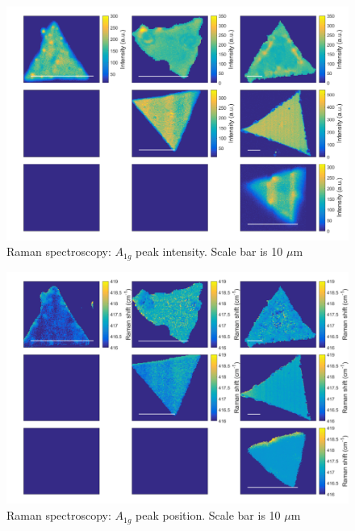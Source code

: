 \documentclass[12pt]{article}
\begin{document}
{\begin{figure}[h]
\begin{center}
\includegraphics[scale=0.3]{PaperSIMapsIntensityA.png}
\caption{Raman spectroscopy: $A_{1g}$ peak intensity. Scale bar is 10 $\mu$m}
\label{fig:PaperSIMapsIntensityA}
\end{center}
\end{figure}

\begin{figure}[h]
\begin{center}
\includegraphics[scale=0.3]{PaperSIMapsPositionA.png}
\caption{Raman spectroscopy: $A_{1g}$ peak position. Scale bar is 10 $\mu$m}
\label{fig:PaperSIMapsPositionA}
\end{center}
\end{figure}

}
\end{document}
